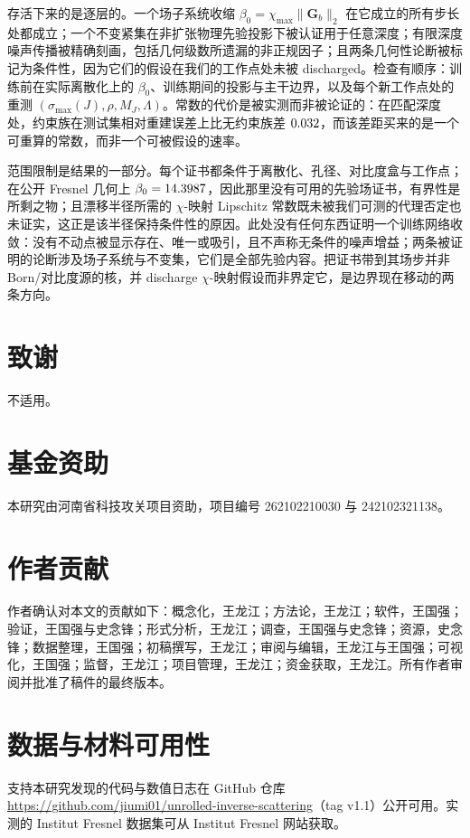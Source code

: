 \documentclass[UTF8,a4paper,11pt]{ctexart}
\newcommand{\norm}[1]{\lVert #1 \rVert}
\newcommand{\numv}[1]{#1}
\begin{document}
存活下来的是逐层的。一个场子系统收缩 $\beta_0=\chi_{\max}\norm{\mathbf{G}_b}_2$ 在它成立的所有步长处都成立；一个不变紧集在非扩张物理先验投影下被认证用于任意深度；有限深度噪声传播被精确刻画，包括几何级数所遗漏的非正规因子；且两条几何性论断被标记为条件性，因为它们的假设在我们的工作点处未被 discharged。检查有顺序：训练前在实际离散化上的 $\beta_0$、训练期间的投影与主干边界，以及每个新工作点处的重测 $(\sigma_{\max}(J),\rho,M_J,\Lambda)$。常数的代价是被实测而非被论证的：在匹配深度处，约束族在测试集相对重建误差上比无约束族差 $\numv{\NumPriceDelta}$，而该差距买来的是一个可重算的常数，而非一个可被假设的速率。

范围限制是结果的一部分。每个证书都条件于离散化、孔径、对比度盒与工作点；在公开 Fresnel 几何上 $\beta_0=\numv{\NumFresnelBeta}$，因此那里没有可用的先验场证书，有界性是所剩之物；且漂移半径所需的 $\chi$-映射 Lipschitz 常数既未被我们可测的代理否定也未证实，这正是该半径保持条件性的原因。此处没有任何东西证明一个训练网络收敛：没有不动点被显示存在、唯一或吸引，且不声称无条件的噪声增益；两条被证明的论断涉及场子系统与不变集，它们是全部先验内容。把证书带到其场步并非 Born/对比度源的核，并 discharge $\chi$-映射假设而非界定它，是边界现在移动的两条方向。

\section*{致谢}
不适用。

\section*{基金资助}
本研究由河南省科技攻关项目资助，项目编号 262102210030 与 242102321138。

\section*{作者贡献}
作者确认对本文的贡献如下：概念化，王龙江；方法论，王龙江；软件，王国强；验证，王国强与史念锋；形式分析，王龙江；调查，王国强与史念锋；资源，史念锋；数据整理，王国强；初稿撰写，王龙江；审阅与编辑，王龙江与王国强；可视化，王国强；监督，王龙江；项目管理，王龙江；资金获取，王龙江。所有作者审阅并批准了稿件的最终版本。

\section*{数据与材料可用性}
支持本研究发现的代码与数值日志在 GitHub 仓库 \url{https://github.com/jiumi01/unrolled-inverse-scattering}（tag v1.1）公开可用。实测的 Institut Fresnel 数据集可从 Institut Fresnel 网站获取。
\end{document}
